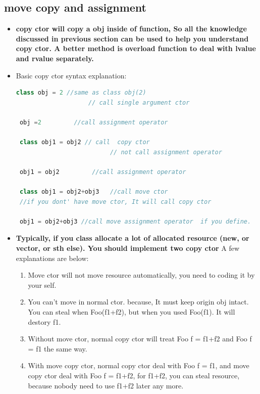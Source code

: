 \documentclass[a4paper,12pt,twoside]{book}
\begin{document}
\subsection{move copy and assignment }
\begin{itemize}
\item \textbf{copy ctor will copy a obj inside of function, So all the knowledge discussed in previous section can be used to help you understand copy ctor. A better method is overload function to deal with lvalue and rvalue separately. }

\item Basic copy ctor syntax explanation:
 \begin{lstlisting}[frame=single, language=c++]
 class obj = 2 //same as class obj(2)
                    // call single argument ctor

 obj =2         //call assignment operator

 class obj1 = obj2 // call  copy ctor
                          // not call assignment operator

 obj1 = obj2         //call assignment operator

 class obj1 = obj2+obj3   //call move ctor
 //if you dont' have move ctor, It will call copy ctor

 obj1 = obj2+obj3 //call move assignment operator  if you define.
\end{lstlisting}


\item \textbf{Typically, if you class allocate a lot of allocated resource (new, or vector, or sth else).  You should implement two copy ctor} A few explanations are below:

\begin{enumerate}
\item Move ctor will not move resource automatically, you need to coding it by your self.

\item You can't move in normal ctor. because, It must keep origin obj intact.  You can steal when Foo(f1+f2), but when you used Foo(f1).  It will destory f1.

\item Without  move ctor, normal copy ctor will treat Foo f = f1+f2 and Foo f = f1 the same way.

\item With move copy ctor, normal copy ctor deal with Foo f = f1, and move copy ctor deal with Foo f = f1+f2, for f1+f2, you can steal resource, because nobody need to use f1+f2 later any more.


\end{enumerate}
\end{itemize}
\end{document}
